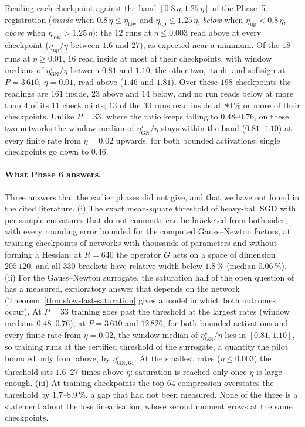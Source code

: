 \documentclass[11pt]{article}
\theoremstyle{remark}
\begin{document}
Reading each checkpoint against the band $[0.8\,\eta,1.25\,\eta]$ of the Phase~5 registration (\emph{inside} when $0.8\,\eta\le\eta_{\mathrm{low}}$ and $\eta_{\mathrm{up}}\le1.25\,\eta$, \emph{below} when $\eta_{\mathrm{up}}<0.8\,\eta$, \emph{above} when $\eta_{\mathrm{low}}>1.25\,\eta$): the $12$ runs at $\eta\le0.003$ read above at every checkpoint ($\eta_{\mathrm{up}}/\eta$ between $1.6$ and $27$), as expected near a minimum. Of the $18$ runs at $\eta\ge0.01$, $16$ read inside at most of their checkpoints, with window medians of $\eta^\star_{\mathrm{GN}}/\eta$ between $0.81$ and $1.10$; the other two, $\tanh$ and softsign at $P=3\,610$, $\eta=0.01$, read above ($1.46$ and $1.81$). Over these $198$ checkpoints the readings are $161$ inside, $23$ above and $14$ below, and no run reads below at more than $4$ of its $11$ checkpoints; $13$ of the $30$ runs read inside at $80\,\%$ or more of their checkpoints. Unlike $P=33$, where the ratio keeps falling to $0.48$--$0.76$, on these two networks the window median of $\eta^\star_{\mathrm{GN}}/\eta$ stays within the band ($0.81$--$1.10$) at every finite rate from $\eta=0.02$ upwards, for both bounded activations; single checkpoints go down to $0.46$.

\paragraph{What Phase 6 answers.} Three answers that the earlier phases did not give, and that we have not found in the cited literature. (i) The exact mean-square threshold of heavy-ball SGD with per-sample curvatures that do not commute can be bracketed from both sides, with every rounding error bounded for the computed Gauss--Newton factors, at training checkpoints of networks with thousands of parameters and without forming a Hessian: at $R=640$ the operator $G$ acts on a space of dimension $205\,120$, and all $330$ brackets have relative width below $1.8\,\%$ (median $0.06\,\%$). (ii) For the Gauss--Newton surrogate, the saturation half of the open question of \citet{andreyev2026momentum} has a measured, exploratory answer that depends on the network (Theorem~\ref{thm:slow-fast-saturation} gives a model in which both outcomes occur). At $P=33$ training goes past the threshold at the largest rates (window medians $0.48$--$0.76$); at $P=3\,610$ and $12\,826$, for both bounded activations and every finite rate from $\eta=0.02$, the window median of $\eta^\star_{\mathrm{GN}}/\eta$ lies in $[0.81,1.10]$, so training runs at the certified threshold of the surrogate, a quantity the pilot bounded only from above, by $\eta^\star_{\mathrm{GN},64}$. At the smallest rates ($\eta\le0.003$) the threshold sits $1.6$--$27$ times above $\eta$: saturation is reached only once $\eta$ is large enough. (iii) At training checkpoints the top-$64$ compression overstates the threshold by $1.7$--$8.9\,\%$, a gap that had not been measured. None of the three is a statement about the loss linearisation, whose second moment grows at the same checkpoints.
\end{document}
